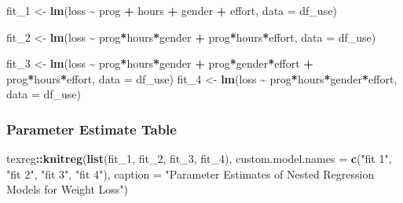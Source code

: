 \documentclass[
]{article}
\newenvironment{Shaded}{\begin{snugshade}}{\end{snugshade}}
\newcommand{\AttributeTok}[1]{\textcolor[rgb]{0.13,0.29,0.53}{#1}}
\newcommand{\FunctionTok}[1]{\textcolor[rgb]{0.13,0.29,0.53}{\textbf{#1}}}
\newcommand{\NormalTok}[1]{#1}
\newcommand{\OtherTok}[1]{\textcolor[rgb]{0.56,0.35,0.01}{#1}}
\newcommand{\SpecialCharTok}[1]{\textcolor[rgb]{0.81,0.36,0.00}{\textbf{#1}}}
\newcommand{\StringTok}[1]{\textcolor[rgb]{0.31,0.60,0.02}{#1}}
\begin{document}
\begin{Shaded}
\begin{Highlighting}[]
\NormalTok{fit\_1 }\OtherTok{\textless{}{-}} \FunctionTok{lm}\NormalTok{(loss }\SpecialCharTok{\textasciitilde{}}\NormalTok{ prog }\SpecialCharTok{+}\NormalTok{ hours }\SpecialCharTok{+}\NormalTok{ gender }\SpecialCharTok{+}\NormalTok{ effort,}
            \AttributeTok{data =}\NormalTok{ df\_use)}

\NormalTok{fit\_2 }\OtherTok{\textless{}{-}} \FunctionTok{lm}\NormalTok{(loss }\SpecialCharTok{\textasciitilde{}}\NormalTok{ prog}\SpecialCharTok{*}\NormalTok{hours}\SpecialCharTok{*}\NormalTok{gender }\SpecialCharTok{+} 
\NormalTok{              prog}\SpecialCharTok{*}\NormalTok{hours}\SpecialCharTok{*}\NormalTok{effort,}
            \AttributeTok{data =}\NormalTok{ df\_use)}

\NormalTok{fit\_3 }\OtherTok{\textless{}{-}} \FunctionTok{lm}\NormalTok{(loss }\SpecialCharTok{\textasciitilde{}}\NormalTok{ prog}\SpecialCharTok{*}\NormalTok{hours}\SpecialCharTok{*}\NormalTok{gender }\SpecialCharTok{+} 
\NormalTok{              prog}\SpecialCharTok{*}\NormalTok{gender}\SpecialCharTok{*}\NormalTok{effort }\SpecialCharTok{+} 
\NormalTok{              prog}\SpecialCharTok{*}\NormalTok{hours}\SpecialCharTok{*}\NormalTok{effort,}
            \AttributeTok{data =}\NormalTok{ df\_use)}
\NormalTok{fit\_4 }\OtherTok{\textless{}{-}} \FunctionTok{lm}\NormalTok{(loss }\SpecialCharTok{\textasciitilde{}}\NormalTok{ prog}\SpecialCharTok{*}\NormalTok{hours}\SpecialCharTok{*}\NormalTok{gender}\SpecialCharTok{*}\NormalTok{effort,}
            \AttributeTok{data =}\NormalTok{ df\_use)}
\end{Highlighting}
\end{Shaded}

\clearpage

\hypertarget{parameter-estimate-table}{%
\subsubsection{Parameter Estimate
Table}\label{parameter-estimate-table}}

\begin{Shaded}
\begin{Highlighting}[]
\NormalTok{texreg}\SpecialCharTok{::}\FunctionTok{knitreg}\NormalTok{(}\FunctionTok{list}\NormalTok{(fit\_1, fit\_2, fit\_3, fit\_4),}
                \AttributeTok{custom.model.names =} \FunctionTok{c}\NormalTok{(}\StringTok{"fit 1"}\NormalTok{, }\StringTok{"fit 2"}\NormalTok{, }\StringTok{"fit 3"}\NormalTok{, }\StringTok{"fit 4"}\NormalTok{),}
                \AttributeTok{caption =} \StringTok{"Parameter Estimates of Nested Regression Models for Weight Loss"}\NormalTok{)}
\end{Highlighting}
\end{Shaded}
\end{document}
